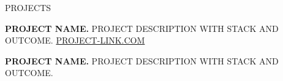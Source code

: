 \documentclass{resume} %
\begin{document}
\begin{rSection}{PROJECTS}
\vspace{-1.25em}
\item \textbf{PROJECT NAME.} {PROJECT DESCRIPTION WITH STACK AND OUTCOME. \href{https://PROJECT-LINK.COM}{PROJECT-LINK.COM}}
\item \textbf{PROJECT NAME.} {PROJECT DESCRIPTION WITH STACK AND OUTCOME.}
\end{rSection}
\end{document}
